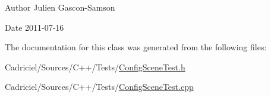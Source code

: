 \begin{DoxyAuthor}{Author}
Julien Gascon-\/\-Samson 
\end{DoxyAuthor}
\begin{DoxyDate}{Date}
2011-\/07-\/16 
\end{DoxyDate}


The documentation for this class was generated from the following files\-:\begin{DoxyCompactItemize}
\item 
Cadriciel/\-Sources/\-C++/\-Tests/\hyperlink{_config_scene_test_8h}{Config\-Scene\-Test.\-h}\item 
Cadriciel/\-Sources/\-C++/\-Tests/\hyperlink{_config_scene_test_8cpp}{Config\-Scene\-Test.\-cpp}\end{DoxyCompactItemize}
